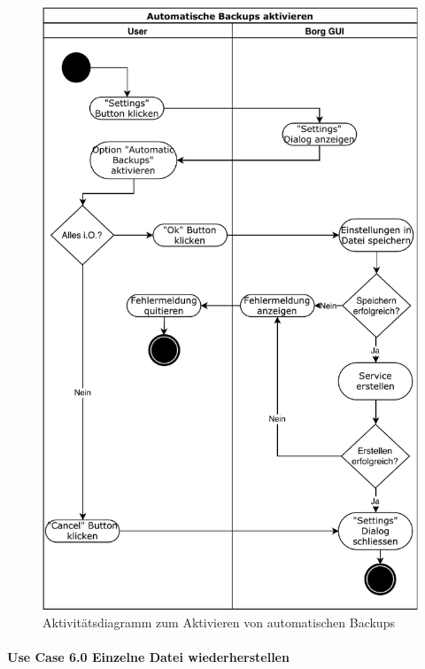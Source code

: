 \begin{figure}[htbp]
\centering
\includegraphics[width=.9\linewidth]{pictures/activity_automatic.pdf}
\caption{\label{fig:orge73dce1}
Aktivitätsdiagramm zum Aktivieren von automatischen Backups}
\end{figure}
\newpage
\paragraph{Use Case 6.0 Einzelne Datei wiederherstellen}
\label{sec:org2c8981d}

